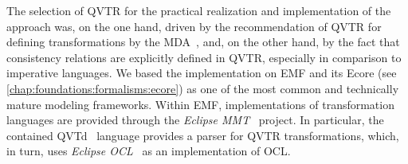 


The selection of \gls{QVTR} for the practical realization and implementation of the approach was, on the one hand, driven by the recommendation of \gls{QVTR} for defining transformations by the \gls{MDA}~\cite{mda}, and, on the other hand, by the fact that consistency relations are explicitly defined in \gls{QVTR}, especially in comparison to imperative languages.
We based the implementation on \gls{EMF} and its Ecore \metametamodel (see \autoref{chap:foundations:formalisms:ecore}) as one of the most common and technically mature modeling frameworks.
Within \gls{EMF}, implementations of transformation languages are provided through the \emph{Eclipse MMT}~\cite{EclipseMMT} project.
In particular, the contained \gls{QVTd}~\cite{EclipseQVTd} language provides a parser for \gls{QVTR} transformations, which, in turn, uses \emph{Eclipse OCL}~\cite{EclipseOCL} as an implementation of \gls{OCL}.

